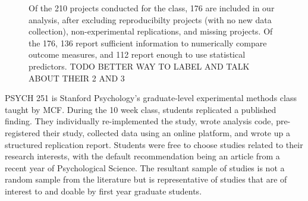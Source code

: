 \documentclass[
  english,
  a4paper,
]{article}
\begin{document}
    
\begin{figure}[ht]
    
\caption{Of the 210 projects conducted for the class, 176 are included in our analysis, after excluding reproducibilty projects (with no new data collection), non-experimental replications, and missing projects. Of the 176, 136 report sufficient information to numerically compare outcome measures, and 112 report enough to use statistical predictors. TODO BETTER WAY TO LABEL AND TALK ABOUT THEIR 2 AND 3}\label{fig:prisma}
\end{figure}

PSYCH 251 is Stanford Psychology's graduate-level experimental methods class taught by MCF. During the 10 week class, students replicated a published finding. They individually re-implemented the study, wrote analysis code, pre-registered their study, collected data using an online platform, and wrote up a structured replication report. Students were free to choose studies related to their research interests, with the default recommendation being an article from a recent year of Psychological Science. The resultant sample of studies is not a random sample from the literature but is representative of studies that are of interest to and doable by first year graduate students.
\end{document}
